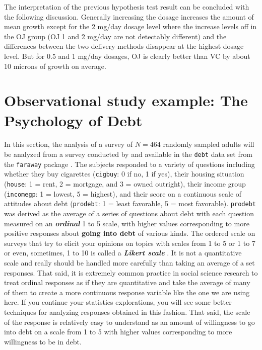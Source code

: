 \documentclass[]{book}
\theoremstyle{definition}
\theoremstyle{definition}
\theoremstyle{remark}
\begin{document}
The interpretation of the previous hypothesis test result can be
concluded with the following discussion. Generally increasing the dosage
increases the amount of mean growth except for the 2 mg/day dosage level
where the increase levels off in the OJ group (OJ 1 and 2 mg/day are not
detectably different) and the differences between the two delivery
methods disappear at the highest dosage level. But for 0.5 and 1 mg/day
dosages, OJ is clearly better than VC by about 10 microns of growth on
average.

\section{Observational study example: The Psychology of
Debt}\label{section4-5}

In this section, the analysis of a survey of \(N=464\) randomly sampled
adults will be analyzed from a survey conducted by \citet{Lea1995} and
available in the \texttt{debt} data set from the \texttt{faraway}
package \citep{R-faraway}. The subjects responded to a variety of
questions including whether they buy cigarettes (\texttt{cigbuy}: 0 if
no, 1 if yes), their housing situation (\texttt{house}: 1 = rent, 2 =
mortgage, and 3 = owned outright), their income group
(\texttt{incomegp}: 1 = lowest, 5 = highest), and their score on a
continuous scale of attitudes about debt (\texttt{prodebt}: 1 = least
favorable, 5 = most favorable). \texttt{prodebt} was derived as the
average of a series of questions about debt with each question measured
on an \textbf{\emph{ordinal}} 1 to 5 scale, with higher values
corresponding to more positive responses about \textbf{going into debt}
of various kinds. The ordered scale on surveys that try to elicit your
opinions on topics with scales from 1 to 5 or 1 to 7 or even, sometimes,
1 to 10 is called a \textbf{\emph{Likert scale}} \citep{Likert1932}. It
is not a quantitative scale and really should be handled more carefully
than taking an average of a set responses. That said, it is extremely
common practice in social science research to treat ordinal responses as
if they are quantitative and take the average of many of them to create
a more continuous response variable like the one we are using here. If
you continue your statistics explorations, you will see some better
techniques for analyzing responses obtained in this fashion. That said,
the scale of the response is relatively easy to understand as an amount
of willingness to go into debt on a scale from 1 to 5 with higher values
corresponding to more willingness to be in debt.
\end{document}
